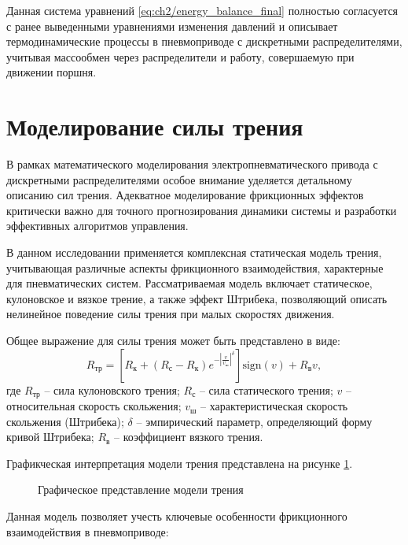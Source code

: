 Данная система уравнений \eqref{eq:ch2/energy_balance_final} полностью согласуется с ранее выведенными
уравнениями изменения давлений и описывает термодинамические процессы в пневмоприводе
с дискретными распределителями, учитывая массообмен через распределители и работу, совершаемую при движении поршня.

\section{Моделирование силы трения}\label{sec:ch2/sec2/subsec4}
В рамках математического моделирования электропневматического привода с
дискретными распределителями особое внимание уделяется детальному описанию сил трения.
Адекватное моделирование фрикционных эффектов критически важно для
точного прогнозирования динамики системы и разработки
эффективных алгоритмов управления.

В данном исследовании применяется комплексная статическая модель трения, учитывающая
различные аспекты фрикционного взаимодействия, характерные для пневматических систем.
Рассматриваемая модель включает статическое, кулоновское и вязкое трение, а также эффект
Штрибека, позволяющий описать нелинейное поведение силы трения при малых скоростях движения.

Общее выражение для силы трения может быть представлено в виде:
\begin{equation}\label{eq:ch2/friction_model}
    R_\text{тр} = \left[R_\text{к} + (R_\text{с} -
        R_\text{к})e^{-\left|\frac{v}{v_\text{ш}}\right|^\delta}\right]
    \text{sign}(v) + R_\text{в} v,
\end{equation}
где $R_\text{тр}$ -- сила кулоновского трения;
$R_\text{с}$  -- сила статического трения;
$v$ -- относительная скорость скольжения;
$v_\text{ш}$ -- характеристическая скорость скольжения (Штрибека);
$\delta$ -- эмпирический параметр, определяющий форму кривой Штрибека;
$R_\text{в}$ -- коэффициент вязкого трения.

Графикческая интерпретация модели трения представлена на рисунке \ref{fig:ch2/friction_model}.
\begin{figure}[ht]
    \caption{Графическое представление модели трения}
    \label{fig:ch2/friction_model}
\end{figure}

Данная модель позволяет учесть ключевые особенности фрикционного взаимодействия в пневмоприводе:

